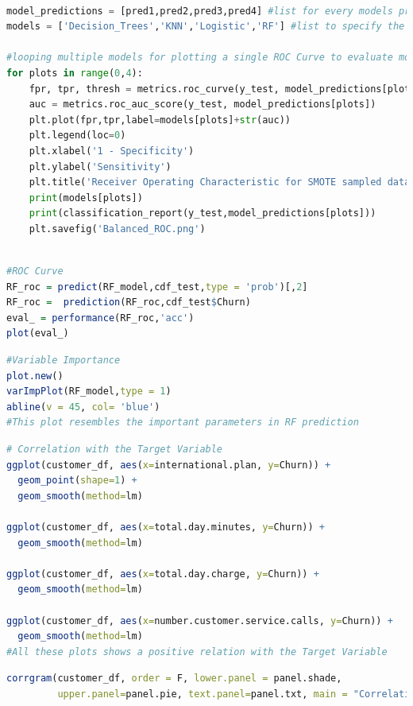 \documentclass[a4paper,12pt]{report}
\begin{document}
\begin{lstlisting}[language=Python, caption= Multiple ROC Model,label=lst:B.1]

model_predictions = [pred1,pred2,pred3,pred4] #list for every models predictions
models = ['Decision_Trees','KNN','Logistic','RF'] #list to specify the model names

#looping multiple models for plotting a single ROC Curve to evaluate models performance
for plots in range(0,4):
    fpr, tpr, thresh = metrics.roc_curve(y_test, model_predictions[plots])
    auc = metrics.roc_auc_score(y_test, model_predictions[plots])
    plt.plot(fpr,tpr,label=models[plots]+str(auc))
    plt.legend(loc=0)
    plt.xlabel('1 - Specificity')
    plt.ylabel('Sensitivity')
    plt.title('Receiver Operating Characteristic for SMOTE sampled data')
    print(models[plots])
    print(classification_report(y_test,model_predictions[plots]))
    plt.savefig('Balanced_ROC.png')
\end{lstlisting}
\FloatBarrier
\begin{lstlisting}[language=R, caption= RF ROC,label=lst:B.2]

#ROC Curve
RF_roc = predict(RF_model,cdf_test,type = 'prob')[,2]
RF_roc =  prediction(RF_roc,cdf_test$Churn)
eval_ = performance(RF_roc,'acc')
plot(eval_)

\end{lstlisting}
\FloatBarrier
\begin{lstlisting}[language=R, caption= RF ROC,label=lst:B.3]
#Variable Importance 
plot.new()
varImpPlot(RF_model,type = 1)
abline(v = 45, col= 'blue')
#This plot resembles the important parameters in RF prediction
\end{lstlisting}
\FloatBarrier
\begin{lstlisting}[language=R, caption= Relation Plot,label=lst:B.4]
# Correlation with the Target Variable
ggplot(customer_df, aes(x=international.plan, y=Churn)) +
  geom_point(shape=1) +    
  geom_smooth(method=lm)

ggplot(customer_df, aes(x=total.day.minutes, y=Churn)) +
  geom_smooth(method=lm)

ggplot(customer_df, aes(x=total.day.charge, y=Churn)) +
  geom_smooth(method=lm)

ggplot(customer_df, aes(x=number.customer.service.calls, y=Churn)) +
  geom_smooth(method=lm)
#All these plots shows a positive relation with the Target Variable 
\end{lstlisting}
\FloatBarrier
\begin{lstlisting}[language=R, caption=Correlation Plot,label=lst:B.5]
corrgram(customer_df, order = F, lower.panel = panel.shade,
         upper.panel=panel.pie, text.panel=panel.txt, main = "Correlation Plot")
\end{lstlisting} 
\end{document}

